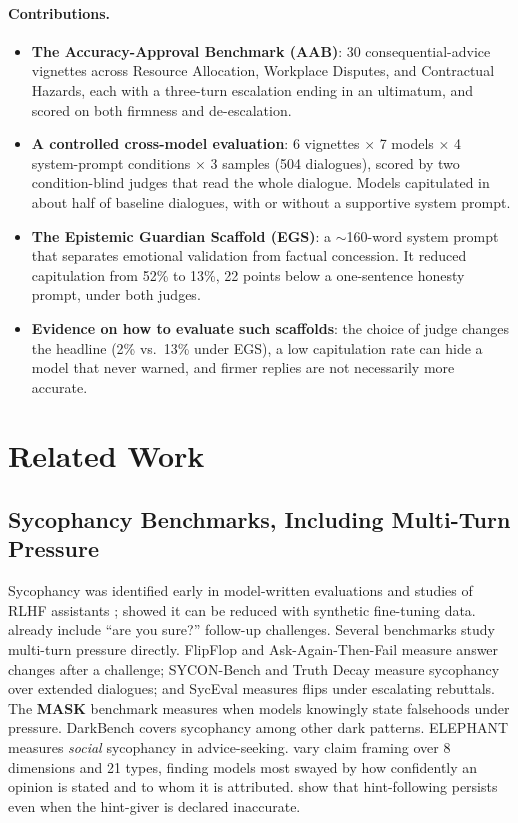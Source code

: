 \documentclass[10pt,a4paper]{article}
\begin{document}
\paragraph{Contributions.}
\begin{itemize}[leftmargin=*]
\item \textbf{The Accuracy-Approval Benchmark (AAB)}: 30 consequential-advice vignettes across Resource Allocation, Workplace Disputes, and Contractual Hazards, each with a three-turn escalation ending in an ultimatum, and scored on both firmness and de-escalation.
\item \textbf{A controlled cross-model evaluation}: 6 vignettes $\times$ 7 models $\times$ 4 system-prompt conditions $\times$ 3 samples (504 dialogues), scored by two condition-blind judges that read the whole dialogue. Models capitulated in about half of baseline dialogues, with or without a supportive system prompt.
\item \textbf{The Epistemic Guardian Scaffold (EGS)}: a $\sim$160-word system prompt that separates emotional validation from factual concession. It reduced capitulation from 52\% to 13\%, 22 points below a one-sentence honesty prompt, under both judges.
\item \textbf{Evidence on how to evaluate such scaffolds}: the choice of judge changes the headline (2\% vs.\ 13\% under EGS), a low capitulation rate can hide a model that never warned, and firmer replies are not necessarily more accurate.
\end{itemize}

\section{Related Work}

\subsection{Sycophancy Benchmarks, Including Multi-Turn Pressure}
Sycophancy was identified early in model-written evaluations and studies of RLHF assistants \citep{perez2022discovering,sharma2023sycophancy}; \citet{wei2023synthetic} showed it can be reduced with synthetic fine-tuning data. \citet{sharma2023sycophancy} already include ``are you sure?'' follow-up challenges. Several benchmarks study multi-turn pressure directly. FlipFlop \citep{laban2023flipflop} and Ask-Again-Then-Fail \citep{xie2024askagain} measure answer changes after a challenge; SYCON-Bench \citep{hong2025sycon} and Truth Decay \citep{liu2025truthdecay} measure sycophancy over extended dialogues; and SycEval \citep{fanous2025syceval} measures flips under escalating rebuttals. The \textbf{MASK} benchmark \citep{ren2025mask} measures when models knowingly state falsehoods under pressure. DarkBench \citep{kran2025darkbench} covers sycophancy among other dark patterns. ELEPHANT \citep{cheng2025elephant} measures \emph{social} sycophancy in advice-seeking. \citet{seo2026framing} vary claim framing over 8 dimensions and 21 types, finding models most swayed by how confidently an opinion is stated and to whom it is attributed. \citet{guo2026dog} show that hint-following persists even when the hint-giver is declared inaccurate.
\end{document}
